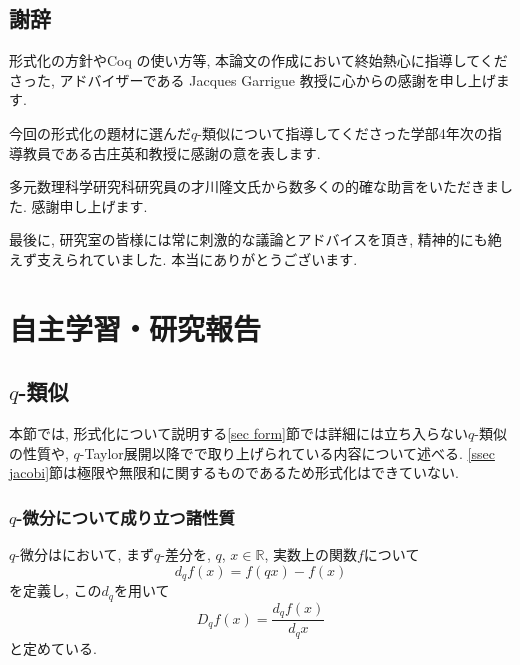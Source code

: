 \documentclass[11pt]{jsreport}
\theoremstyle{mystyle}
\newcommand{\R}{\mathbb{R}}
\newcommand{\0}{\textbf{0}}
\begin{document}
\section*{謝辞}
形式化の方針やCoq の使い方等, 本論文の作成において終始熱心に指導してくださった, アドバイザーである Jacques Garrigue 教授に心からの感謝を申し上げます. 

今回の形式化の題材に選んだ$q$-類似について指導してくださった学部4年次の指導教員である古庄英和教授に感謝の意を表します. 

多元数理科学研究科研究員の才川隆文氏から数多くの的確な助言をいただきました. 感謝申し上げます. 

最後に, 研究室の皆様には常に刺激的な議論とアドバイスを頂き, 精神的にも絶えず支えられていました. 本当にありがとうございます. 
\chapter{自主学習・研究報告} \label{chap thesis}
\section{$q$-類似} \label{sec qana}
本節では, 形式化について説明する\ref{sec form}節では詳細には立ち入らない$q$-類似の性質や, $q$-Taylor展開以降で\cite{Kac}で取り上げられている内容について述べる. 
\ref{ssec jacobi}節は極限や無限和に関するものであるため形式化はできていない. 
\subsection{$q$-微分について成り立つ諸性質} \label{ssec qprops}
$q$-微分は\cite{Kac}において, まず$q$-差分を, $q$, $x \in \R$, 実数上の関数$f$について
\[
  d_q f(x) = f(qx) - f(x)
\]
を定義し, この$d_q$を用いて
\[
  D_q f(x) = \frac{d_q f(x)}{d_q x}
\]
と定めている. 
\end{document}
